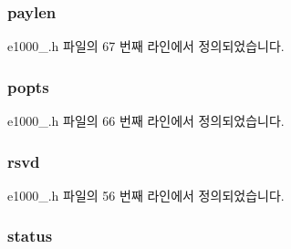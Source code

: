 \subsubsection[{\texorpdfstring{paylen}{paylen}}]{ paylen}\hypertarget{structe1000__adv__data__desc_a3745104ec47a98e80e861672b619526d}{}\label{structe1000__adv__data__desc_a3745104ec47a98e80e861672b619526d}


e1000\+\_.\+h 파일의 67 번째 라인에서 정의되었습니다.

\subsubsection[{\texorpdfstring{popts}{popts}}]{ popts}\hypertarget{structe1000__adv__data__desc_a106d78282b65a8b40042211077712109}{}\label{structe1000__adv__data__desc_a106d78282b65a8b40042211077712109}


e1000\+\_.\+h 파일의 66 번째 라인에서 정의되었습니다.

\subsubsection[{\texorpdfstring{rsvd}{rsvd}}]{ rsvd}\hypertarget{structe1000__adv__data__desc_a3b6bf7c76c3f4f846232f50992776bfd}{}\label{structe1000__adv__data__desc_a3b6bf7c76c3f4f846232f50992776bfd}


e1000\+\_.\+h 파일의 56 번째 라인에서 정의되었습니다.

\subsubsection[{\texorpdfstring{status}{status}}]{ status}\hypertarget{structe1000__adv__data__desc_a088e3e37581e2ecb5079c1d75067923f}{}\label{structe1000__adv__data__desc_a088e3e37581e2ecb5079c1d75067923f}


